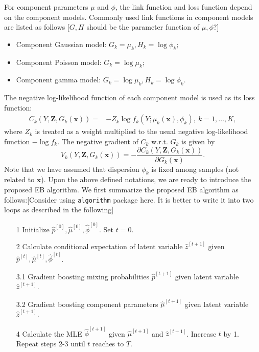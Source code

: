 \documentclass[11pt]{article}
\numberwithin{equation}{section}
\def\bx{\boldsymbol{x}}
\def\bZ{\boldsymbol{Z}}
\newcommand{\blue}[1]{\textcolor{blue}{#1}}
\begin{document}
For component parameters $\mu$ and $\phi$, the link function and loss function  depend on the component models.
Commonly used link functions in component models are listed as follows {\color{blue}[$G,H$ should be the parameter function of $\mu,\phi$?]}
	\begin{itemize}
		\item Component Gaussian model:
		$G_k=\mu_k, H_k=\log \phi_k;$
		\item Component Poisson model:
		$G_k=\log\mu_k;$
		\item Component gamma model:
				$G_k=\log \mu_k, H_k=\log \phi_k.$
	\end{itemize}
The negative log-likelihood function of each component model is used as its loss function:
	\begin{equation}
		\begin{aligned}
			{C_k(Y,\bZ,G_k(\bx))}=& -Z_k\log f_k(Y;\mu_k(\bx),\phi_k), ~ k=1,\ldots,K,
		\end{aligned}
	\end{equation}
where $Z_k$ is treated as a weight multiplied to the usual negative log-likelihood function $-\log f_k$.
	The negative gradient of $C_k$ w.r.t. $G_k$ is given by 
	$${V_k(Y,\bZ,G_k(\bx))}=-\frac{\partial C_k(Y,\bZ,G_k(\bx))}{\partial G_k(\bx)}.$$
	Note that we have assumed that dispersion $\phi_k$ is fixed among samples (not related to $\bx$). 
Upon the above defined notations, we are ready to introduce the proposed EB algorithm.
We first summarize the proposed EB algorithm as follows:{\color{blue}[Consider using {\tt algorithm} package here. It is better to write it into two loops as described in the following]}
\begin{enumerate}
	\item[1] Initialize $\hat{p}^{[0]},\hat{\mu}^{[0]},\hat{\phi}^{[0]}$. Set $t=0$.
	\item[2] Calculate conditional expectation of latent variable $\hat{z}^{[t+1]}$ given $\hat{p}^{[t]},\hat{\mu}^{[t]},\hat{\phi}^{[t]}$.
	\item[3.1]  Gradient boosting mixing probabilities $\hat{p}^{[t+1]}$  given latent variable $\hat{z}^{[t+1]}$.
	\item[3.2] Gradient boosting component parameters $\hat{\mu}^{[t+1]}$ given latent variable $\hat{z}^{[t+1]}$.
	\item[4]  Calculate the MLE $\hat{\phi}^{[t+1]}$ given $\hat{\mu}^{[t+1]}$ and $\hat{z}^{[t+1]}$. Increase $t$ by 1. Repeat steps 2-3 until $t$ reaches to $T$.
\end{enumerate}
\end{document}
